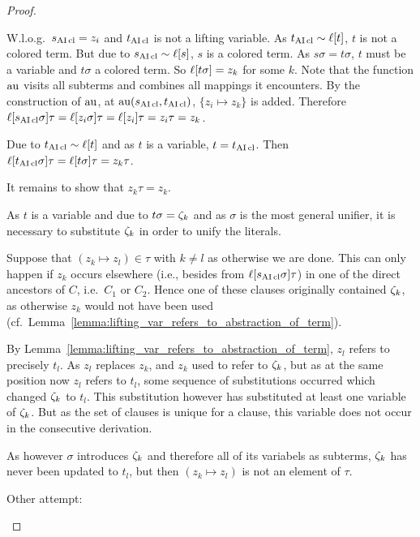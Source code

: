 \documentclass[,%
	paper=a4,%
	DIV12, %
	twoside=false,%
	liststotoc,
	bibtotoc,
	draft=false,%
	numbers=noendperiod
]{scrartcl}
\begin{document}
\begin{proof}
\begin{description}
\begin{compactitem}
			\item W.l.o.g.~$s_{\operatorname{AI}\mathrm{cl}} = z_i$ and $t_{\operatorname{AI}\mathrm{cl}}$ is not a lifting variable.
				As $t_{\operatorname{AI}\mathrm{cl}} \sim \ell[t]$, $t$ is not a colored term.
				But due to $s_{\operatorname{AI}\mathrm{cl}} \sim \ell[s]$, $s$ is a colored term.
				As $s\sigma = t\sigma$, $t$ must be a variable and $t\sigma$ a colored term.
				So $\ell[t\sigma] = z_k$ for some $k$.
				Note that the function $\operatorname{au}$ visits all subterms and combines all mappings it encounters.
				By the construction of $\operatorname{au}$, at $\operatorname{au}(s_{\operatorname{AI}\mathrm{cl}}, t_{\operatorname{AI}\mathrm{cl}})$, $\{ z_i \mapsto z_k \}$ is added.
				Therefore $\ell[s_{\operatorname{AI}\mathrm{cl}}\sigma]\tau = \ell[z_i\sigma]\tau = \ell[z_i]\tau = z_i\tau = z_k$.

				\cbstart
				Due to $t_{\operatorname{AI}\mathrm{cl}} \sim \ell[t]$ and as $t$ is a variable, $t=t_{\operatorname{AI}\mathrm{cl}}$.
				Then $\ell[t_{\operatorname{AI}\mathrm{cl}}\sigma]\tau = \ell[t\sigma]\tau = z_k\tau$.

				It remains to show that $z_k\tau = z_k$.

				As $t$ is a variable and due to $t\sigma = \zeta_{k}$ and as $\sigma$ is the most general unifier, it is necessary to substitute $\zeta_{k}$ in order to unify the literals. 


				Suppose that $(z_k \mapsto z_l) \in \tau$ with $k\neq l$ as otherwise we are done.
				This can only happen if $z_k$ occurs elsewhere (i.e., besides from $\ell[s_{\operatorname{AI}\mathrm{cl}}\sigma]\tau$) in one of the direct ancestors of $C$, i.e.\ $C_1$ or $C_2$. 
				Hence one of these clauses originally contained $\zeta_{k}$, as otherwise $z_k$ would not have been used (cf.\ Lemma~\ref{lemma:lifting_var_refers_to_abstraction_of_term}).
				
				By Lemma~\ref{lemma:lifting_var_refers_to_abstraction_of_term}, $z_l$ refers to precisely $t_l$. %
				As $z_l$ replaces $z_k$, and $z_k$ used to refer to $\zeta_{k}$, but as at the same position now $z_l$ refers to $t_l$, some sequence of substitutions occurred which changed $\zeta_{k}$ to $t_l$. 
				This substitution however has substituted at least one variable of $\zeta_{k}$.
				But as the set of clauses is unique for a clause, this variable does not occur in the consecutive derivation.

				As however $\sigma$ introduces $\zeta_{k}$ and therefore all of its variabels as subterms, 
				$\zeta_{k}$ has never been updated to $t_l$, but then $(z_k \mapsto z_l)$ is not an element of $\tau$.
				{

				\tiny
				Other attempt: 

}
\end{compactitem}
\end{description}
\end{proof}
\end{document}
